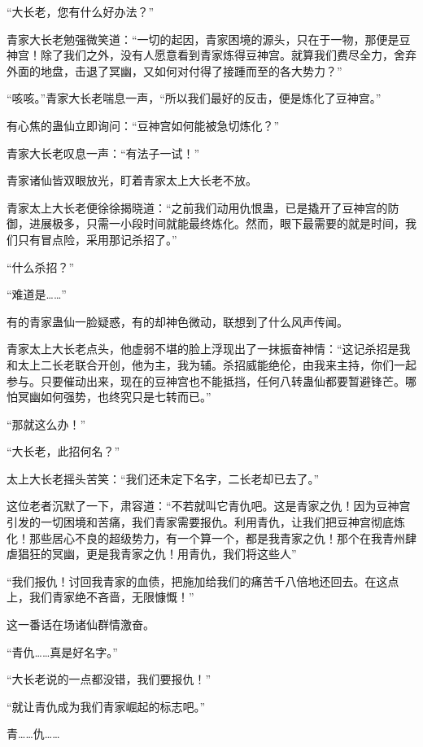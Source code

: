 
\begin{this_body}

“大长老，您有什么好办法？”

青家大长老勉强微笑道：“一切的起因，青家困境的源头，只在于一物，那便是豆神宫！除了我们之外，没有人愿意看到青家炼得豆神宫。就算我们费尽全力，舍弃外面的地盘，击退了冥幽，又如何对付得了接踵而至的各大势力？”

“咳咳。”青家大长老喘息一声，“所以我们最好的反击，便是炼化了豆神宫。”

有心焦的蛊仙立即询问：“豆神宫如何能被急切炼化？”

青家大长老叹息一声：“有法子一试！”

青家诸仙皆双眼放光，盯着青家太上大长老不放。

青家太上大长老便徐徐揭晓道：“之前我们动用仇恨蛊，已是撬开了豆神宫的防御，进展极多，只需一小段时间就能最终炼化。然而，眼下最需要的就是时间，我们只有冒点险，采用那记杀招了。”

“什么杀招？”

“难道是……”

有的青家蛊仙一脸疑惑，有的却神色微动，联想到了什么风声传闻。

青家太上大长老点头，他虚弱不堪的脸上浮现出了一抹振奋神情：“这记杀招是我和太上二长老联合开创，他为主，我为辅。杀招威能绝伦，由我来主持，你们一起参与。只要催动出来，现在的豆神宫也不能抵挡，任何八转蛊仙都要暂避锋芒。哪怕冥幽如何强势，也终究只是七转而已。”

“那就这么办！”

“大长老，此招何名？”

太上大长老摇头苦笑：“我们还未定下名字，二长老却已去了。”

这位老者沉默了一下，肃容道：“不若就叫它青仇吧。这是青家之仇！因为豆神宫引发的一切困境和苦痛，我们青家需要报仇。利用青仇，让我们把豆神宫彻底炼化！那些居心不良的超级势力，有一个算一个，都是我青家之仇！那个在我青州肆虐猖狂的冥幽，更是我青家之仇！用青仇，我们将这些人”

“我们报仇！讨回我青家的血债，把施加给我们的痛苦千八倍地还回去。在这点上，我们青家绝不吝啬，无限慷慨！”

这一番话在场诸仙群情激奋。

“青仇……真是好名字。”

“大长老说的一点都没错，我们要报仇！”

“就让青仇成为我们青家崛起的标志吧。”

青……仇……


\end{this_body}
